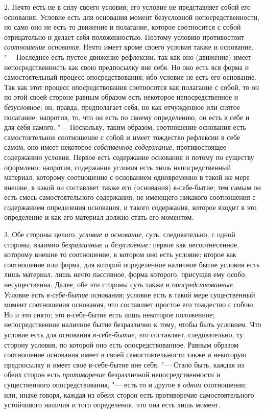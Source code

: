 2. Нечто есть не в силу своего условия; его условие не представляет собой
его основания. Условие есть для основания момент безусловной
непосредственности, но само оно не есть то движение и полагание, которое
соотносится с собой отрицательно и делает себя положенностью. Поэтому
условию противостоит {\em соотношение основания}. Нечто
имеет кроме своего условия также и основание. "--- Последнее есть пустое
движение рефлексии, так как оно (движение) имеет непосредственность как
свою предпосылку вне себя. Но оно есть вся форма и самостоятельный процесс
опосредствования; ибо условие не есть его основание. Так как этот процесс
опосредствования соотносится как полагание с собой, то он по этой своей
стороне равным образом есть некоторое непосредственное и
{\em безусловное;} он, правда, предполагает себя, но
как отчужденное или снятое полагание; напротив, то, что он есть по своему
определению, он есть в себе и для себя самого. "--- Поскольку, таким образом,
соотношение основания есть самостоятельное соотношение с собой и имеет
тождество рефлексии в себе самом, оно имеет некоторое
{\em собственное содержание}, противостоящее содержанию
условия. Первое есть содержание основания и потому по существу оформлено;
напротив, содержание условия есть лишь непосредственный материал, которому
соотношение с основанием одновременно в такой же мере внешне, в какой он
составляет также его (основания) в-себе-бытие; тем самым он есть смесь
самостоятельного содержания, не имеющего никакого соотношения с содержанием
определения основания, и такого содержания, которое входит в это
определение и как его материал должно стать его моментом.

3. Обе стороны целого, {\em условие и основание}, суть,
следовательно, с одной стороны, взаимно
{\em безразличные и безусловные:} первое как
несоотнесенное, которому внешне то соотношение, в котором оно есть условие;
второе как соотношение или форма, для которой определенное наличное бытие
условия есть лишь материал, лишь нечто пассивное, форма которого, присущая
ему особо, несущественна. Далее, обе эти стороны суть также и
{\em опосредствованные}. Условие есть
{\em в-себе-бытие} основания; условие есть в такой мере
существенный момент соотношения основания, что составляет простое его
тождество с собою. Но и это снято; это в-себе-бытие есть лишь некоторое
положенное; непосредственное наличное бытие безразлично к тому, чтобы быть
условием. Что условие есть для основания
{\em в-себе-бытие}, это составляет, следовательно, ту
сторону условия, по которой оно есть опосредствованное. Равным образом
соотношение основания имеет в своей самостоятельности также и некоторую
предпосылку и имеет свое в-себе-бытие вне себя. "--- Стало быть, каждая из
обеих сторон есть {\em противоречие} безразличной
непосредственности и существенного опосредствования, "--- есть то и другое в
{\em одном} соотношении; или, иначе говоря, каждая из
обеих сторон есть противоречие самостоятельного устойчивого наличия и того
определения, что она есть лишь момент.

